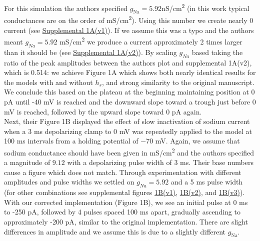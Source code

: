 For this simulation the authors specified $g_{\text{Na}}=5.92$nS/cm\textsuperscript{2} (in this work typical conductances are on the order of mS/cm\textsuperscript{2}). Using this number we create nearly 0 current (see \href{https://github.com/mupsh/ReScience\_Qian\_2014/blob/master/figures/figure\_supp\_1A\_v1.pdf}{Supplemental 1A(v1)}). If we assume this was a typo and the authors meant $g_{Na}=5.92$ mS/cm\textsuperscript{2} we produce a current approximately 2 times larger than it should be (see \href{https://github.com/mupsh/ReScience\_Qian\_2014/blob/master/figures/figure\_supp\_1A_v2.pdf}{Supplemental 1A(v2)}). By scaling $g_{Na}$ based taking the ratio of the peak amplitudes between the authors plot and supplemental 1A(v2), which is 0.514: we achieve Figure 1A which shows both nearly identical results for the models with and without $h_s$, and strong similarity to the original manuscript. We conclude this based on the plateau at the beginning maintaining position at 0 pA until -40 mV is reached and the downward slope toward a trough just before 0 mV is reached, followed by the upward slope toward 0 pA again.\\ 

Next, their Figure 1B displayed the effect of slow inactivation of sodium current when a 3 ms depolarizing clamp to 0 mV was repeatedly applied to the model at 100 ms intervals from a holding potential of $-70$ mV. Again, we assume that sodium conductance should have been given in mS/cm\textsuperscript{2} and the authors specified a magnitude of $9.12$ with a depolarizing pulse width of 3 ms. Their base numbers cause a figure which does not match. Through experimentation with different amplitudes and pulse widths we settled on $g_{Na}=5.92$ and a 5 ms pulse width (for other combinations see supplemental figures \href{https://github.com/mupsh/ReScience\_Qian\_2014/blob/master/figures/figure\_supp\_1B_v1.pdf}{1B(v1)}, \href{https://github.com/mupsh/ReScience\_Qian\_2014/blob/master/figures/figure\_supp\_1B\_v2.pdf}{1B(v2)}, and \href{https://github.com/mupsh/ReScience\_Qian\_2014/blob/master/figures/figure\_supp\_1B\_v3.pdf}{1B(v3)}). With our corrected implementation (Figure 1B), we see an initial pulse at 0 ms to -250 pA, followed by 4 pulses spaced 100 ms apart, gradually ascending to approximately -200 pA, similar to the original implementation. There are slight differences in amplitude and we assume this is due to a slightly different $g_{\text{Na}}$.\\

